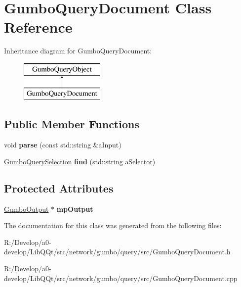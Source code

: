 \hypertarget{class_gumbo_query_document}{}\section{Gumbo\+Query\+Document Class Reference}
\label{class_gumbo_query_document}
Inheritance diagram for Gumbo\+Query\+Document\+:\begin{figure}[H]
\begin{center}
\leavevmode
\includegraphics[height=2.000000cm]{class_gumbo_query_document}
\end{center}
\end{figure}
\subsection*{Public Member Functions}
\begin{DoxyCompactItemize}
\item 
\mbox{\label{class_gumbo_query_document_a64347edb8e80b89d35134dd1cbb33217}} 
void {\bfseries parse} (const std\+::string \&a\+Input)
\item 
\mbox{\label{class_gumbo_query_document_a5a166e3e7a620442c41692ddfe2b49d7}} 
\mbox{\hyperlink{class_gumbo_query_selection}{Gumbo\+Query\+Selection}} {\bfseries find} (std\+::string a\+Selector)
\end{DoxyCompactItemize}
\subsection*{Protected Attributes}
\begin{DoxyCompactItemize}
\item 
\mbox{\label{class_gumbo_query_document_a40f4571ea674508dedd015d3ddecb152}} 
\mbox{\hyperlink{gumbo_8h_ac09b34c35171e94412a6ceb04dce4c12}{Gumbo\+Output}} $\ast$ {\bfseries mp\+Output}
\end{DoxyCompactItemize}


The documentation for this class was generated from the following files\+:\begin{DoxyCompactItemize}
\item 
R\+:/\+Develop/a0-\/develop/\+Lib\+Q\+Qt/src/network/gumbo/query/src/Gumbo\+Query\+Document.\+h\item 
R\+:/\+Develop/a0-\/develop/\+Lib\+Q\+Qt/src/network/gumbo/query/src/Gumbo\+Query\+Document.\+cpp\end{DoxyCompactItemize}
